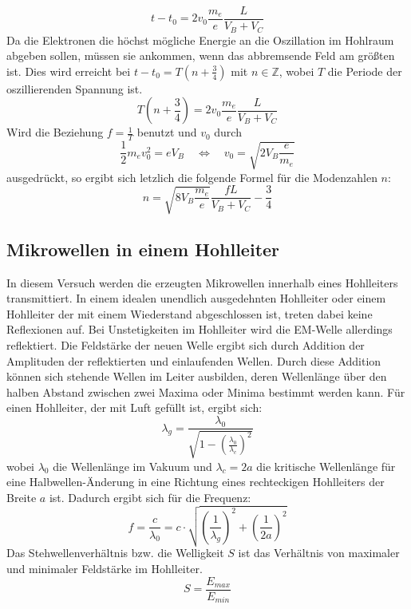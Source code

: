         \begin{equation*}
            t - t_0 = 2 v_0 \frac{m_e}{e} \frac{L}{V_B + V_C}
        \end{equation*}
        Da die Elektronen die höchst mögliche Energie an die Oszillation im Hohlraum abgeben sollen, müssen sie ankommen, wenn das abbremsende Feld am größten ist.
        Dies wird erreicht bei $t - t_0 = T (n + \frac{3}{4})$ mit $n \in \mathbb{Z}$, wobei $T$ die Periode der oszillierenden Spannung ist.
        \begin{equation*}
            T \left(n + \frac{3}{4} \right) = 2 v_0 \frac{m_e}{e} \frac{L}{V_B + V_C}
        \end{equation*}
        Wird die Beziehung $f = \frac{1}{T}$ benutzt und $v_0$ durch
        \begin{equation*}
            \frac{1}{2} m_e v_0^2 = e V_B \quad \Leftrightarrow \quad v_0 = \sqrt{2 V_B \frac{e}{m_e}}
        \end{equation*}
        ausgedrückt, so ergibt sich letzlich die folgende Formel für die Modenzahlen $n$:
        \begin{equation}
            \label{eqn:moden}
            n = \sqrt{8 V_B \frac{m_e}{e}} \frac{f L}{V_B + V_C} - \frac{3}{4}
        \end{equation}

    \newpage
    \subsection{Mikrowellen in einem Hohlleiter}
    \label{sec:Hohlleiter}
        In diesem Versuch werden die erzeugten Mikrowellen innerhalb eines Hohlleiters transmittiert.
        In einem idealen unendlich ausgedehnten Hohlleiter oder einem Hohlleiter der mit einem Wiederstand abgeschlossen ist, treten dabei keine Reflexionen auf.
        Bei Unstetigkeiten im Hohlleiter wird die EM-Welle allerdings reflektiert. 
        Die Feldstärke der neuen Welle ergibt sich durch Addition der Amplituden der reflektierten und einlaufenden Wellen.
        Durch diese Addition können sich stehende Wellen im Leiter ausbilden, deren Wellenlänge über den halben Abstand zwischen zwei Maxima oder Minima bestimmt werden kann.
        Für einen Hohlleiter, der mit Luft gefüllt ist, ergibt sich:
        \begin{equation}
            \lambda_g = \frac{\lambda_0}{\sqrt{1-\left(\frac{\lambda_0}{\lambda_c}\right)^2}}
        \end{equation}
        wobei $\lambda_0$ die Wellenlänge im Vakuum und $\lambda_c = 2a$ die kritische Wellenlänge für eine Halbwellen-Änderung in eine Richtung eines rechteckigen Hohlleiters der Breite $a$ ist.
        Dadurch ergibt sich für die Frequenz:
        \begin{equation}
            \label{eqn:frequenz}
            f = \frac{c}{\lambda_0} = c \cdot \sqrt{\left(\frac{1}{\lambda_g}\right)^2 + \left(\frac{1}{2a}\right)^2}
        \end{equation}
        Das Stehwellenverhältnis bzw. die Welligkeit $S$ ist das Verhältnis von maximaler und minimaler Feldstärke im Hohlleiter.
        \begin{equation}
            S = \frac{E_{max}}{E_{min}}
        \end{equation}